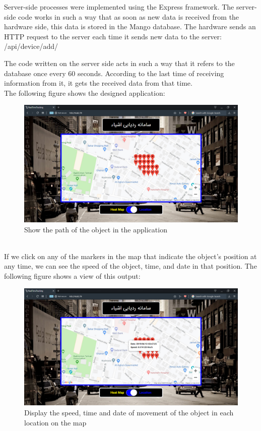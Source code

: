 Server-side processes were implemented using the Express framework. The server-side code works in such a way that as soon as new data is received from the hardware side, this data is stored in the Mango database. The hardware sends an HTTP request to the server each time it sends new data to the server: /api/device/add/

The code written on the server side acts in such a way that it refers to the database once every 60 seconds. According to the last time of receiving information from it, it gets the received data from that time. \\
The following figure shows the designed application:
 \begin{figure}[!h]
	\centerline{\includegraphics[width=.6\textwidth]{webapp3}}
	\caption{Show the path of the object in the application}
\end{figure}\\
If we click on any of the markers in the map that indicate the object's position at any time, we can see the speed of the object, time, and date in that position. The following figure shows a view of this output:
\begin{figure}[!h]
	\centerline{\includegraphics[width=.9\textwidth]{webapp4}}
	\caption{Display the speed, time and date of movement of the object in each location on the map}
\end{figure}
